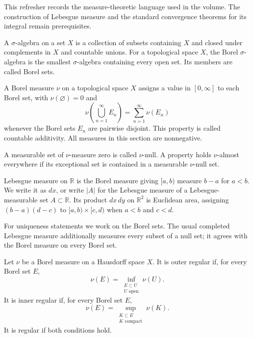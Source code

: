 This refresher records the measure-theoretic language used in the volume. The construction of Lebesgue measure and the standard convergence theorems for its integral remain prerequisites.

\begin{definition}\label{measure.borel-sets}
A $\sigma$-algebra on a set $X$ is a collection of subsets containing $X$ and closed under complements in $X$ and countable unions. For a topological space $X$, the Borel $\sigma$-algebra is the smallest $\sigma$-algebra containing every open set. Its members are called Borel sets.
\end{definition}

\begin{definition}\label{measure.borel}
A Borel measure $\nu$ on a topological space $X$ assigns a value in $[0,\infty]$ to each Borel set, with $\nu(\varnothing)=0$ and
\[
 \nu\left(\bigcup_{n=1}^{\infty}E_n\right)
 =\sum_{n=1}^{\infty}\nu(E_n)
\]
whenever the Borel sets $E_n$ are pairwise disjoint. This property is called countable additivity. All measures in this section are nonnegative.
\end{definition}

\begin{definition}\label{measure.almost-everywhere}
A measurable set of $\nu$-measure zero is called $\nu$-null. A property holds $\nu$-almost everywhere if its exceptional set is contained in a measurable $\nu$-null set.
\end{definition}

\begin{definition}\label{measure.lebesgue}
Lebesgue measure on $\mathbb R$ is the Borel measure giving $[a,b)$ measure $b-a$ for $a<b$. We write it as $dx$, or write $|A|$ for the Lebesgue measure of a Lebesgue-measurable set $A\subset\mathbb R$. Its product $dx\,dy$ on $\mathbb R^2$ is Euclidean area, assigning $(b-a)(d-c)$ to $[a,b)\times[c,d)$ when $a<b$ and $c<d$.
\end{definition}

For uniqueness statements we work on the Borel sets. The usual completed Lebesgue measure additionally measures every subset of a null set; it agrees with the Borel measure on every Borel set.

\begin{definition}[Regularity]\label{measure.regular}
Let $\nu$ be a Borel measure on a Hausdorff space $X$. It is outer regular if, for every Borel set $E$,
\[
 \nu(E)=\inf_{\substack{E\subset U\\U\text{ open}}}\nu(U).
\]
It is inner regular if, for every Borel set $E$,
\[
 \nu(E)=\sup_{\substack{K\subset E\\K\text{ compact}}}\nu(K).
\]
It is regular if both conditions hold.
\end{definition}

